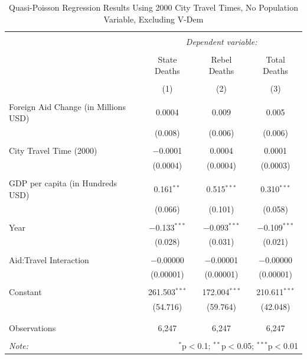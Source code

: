 \documentclass[12pt, letterpaper]{article}
\begin{document}
\begin{table}[!htbp] \centering 
	\caption{Quasi-Poisson Regression Results Using 2000 City Travel Times, No Population Variable, Excluding V-Dem } 
	\label{robustyearly2000nopop} 
	\begin{tabular}{@{\extracolsep{5pt}}lccc} 
		\\[-1.8ex]\hline 
		\hline \\[-1.8ex] 
		& \multicolumn{3}{c}{\textit{Dependent variable:}} \\ 
		\cline{2-4} 
		\\[-1.8ex] & State Deaths & Rebel Deaths & Total Deaths \\ 
		\\[-1.8ex] & (1) & (2) & (3)\\ 
		\hline \\[-1.8ex] 
		Foreign Aid Change (in Millions USD) & 0.0004 & 0.009 & 0.005 \\ 
		& (0.008) & (0.006) & (0.006) \\ 
		& & & \\ 
		City Travel Time (2000) & $-$0.0001 & 0.0004 & 0.0001 \\ 
		& (0.0004) & (0.0004) & (0.0003) \\ 
		& & & \\ 
		GDP per capita (in Hundreds USD) & 0.161$^{**}$ & 0.515$^{***}$ & 0.310$^{***}$ \\ 
		& (0.066) & (0.101) & (0.058) \\ 
		& & & \\ 
		Year & $-$0.133$^{***}$ & $-$0.093$^{***}$ & $-$0.109$^{***}$ \\ 
		& (0.028) & (0.031) & (0.021) \\ 
		& & & \\ 
		Aid:Travel Interaction & $-$0.00000 & $-$0.00001 & $-$0.00000 \\ 
		& (0.00001) & (0.00001) & (0.00001) \\ 
		& & & \\ 
		Constant & 261.503$^{***}$ & 172.004$^{***}$ & 210.611$^{***}$ \\ 
		& (54.716) & (59.764) & (42.048) \\ 
		& & & \\ 
		\hline \\[-1.8ex] 
		Observations & 6,247 & 6,247 & 6,247 \\ 
		\hline 
		\hline \\[-1.8ex] 
		\textit{Note:}  & \multicolumn{3}{r}{$^{*}$p$<$0.1; $^{**}$p$<$0.05; $^{***}$p$<$0.01} \\ 
	\end{tabular} 
\end{table} 
\end{document}
